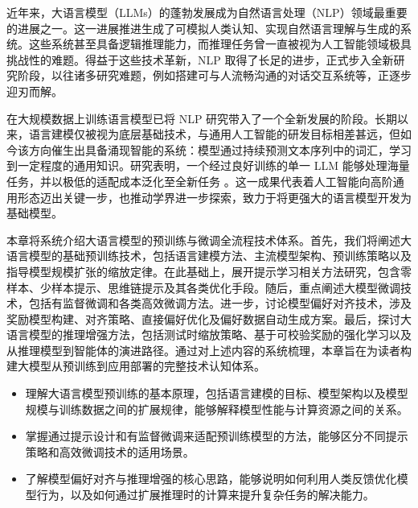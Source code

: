 \noindent 近年来，大语言模型（LLMs）的蓬勃发展成为自然语言处理（NLP）领域最重要的进展之一。这一进展推进生成了可模拟人类认知、实现自然语言理解与生成的系统。这些系统甚至具备逻辑推理能力，而推理任务曾一直被视为人工智能领域极具挑战性的难题。得益于这些技术革新，NLP 取得了长足的进步，正式步入全新研究阶段，以往诸多研究难题，例如搭建可与人流畅沟通的对话交互系统等，正逐步迎刃而解。

在大规模数据上训练语言模型已将 NLP 研究带入了一个全新发展的阶段。长期以来，语言建模仅被视为底层基础技术，与通用人工智能的研发目标相差甚远，但如今该方向催生出具备涌现智能的系统：模型通过持续预测文本序列中的词汇，学习到一定程度的通用知识。研究表明，一个经过良好训练的单一 LLM 能够处理海量任务，并以极低的适配成本泛化至全新任务 \cite{bubeck-etal:2023sparks}。这一成果代表着人工智能向高阶通用形态迈出关键一步，也推动学界进一步探索，致力于将更强大的语言模型开发为基础模型。

本章将系统介绍大语言模型的预训练与微调全流程技术体系。首先，我们将阐述大语言模型的基础预训练技术，包括语言建模方法、主流模型架构、预训练策略以及指导模型规模扩张的缩放定律。在此基础上，展开提示学习相关方法研究，包含零样本、少样本提示、思维链提示及其各类优化手段。随后，重点阐述大模型微调技术，包括有监督微调和各类高效微调方法。进一步，讨论模型偏好对齐技术，涉及奖励模型构建、对齐策略、直接偏好优化及偏好数据自动生成方案。最后，探讨大语言模型的推理增强方法，包括测试时缩放策略、基于可校验奖励的强化学习以及从推理模型到智能体的演进路径。通过对上述内容的系统梳理，本章旨在为读者构建大模型从预训练到应用部署的完整技术认知体系。

\begin{learninggoals}
  \begin{itemize}
    \item 理解大语言模型预训练的基本原理，包括语言建模的目标、模型架构以及模型规模与训练数据之间的扩展规律，能够解释模型性能与计算资源之间的关系。
    \item 掌握通过提示设计和有监督微调来适配预训练模型的方法，能够区分不同提示策略和高效微调技术的适用场景。
    \item 了解模型偏好对齐与推理增强的核心思路，能够说明如何利用人类反馈优化模型行为，以及如何通过扩展推理时的计算来提升复杂任务的解决能力。
  \end{itemize}
\end{learninggoals}